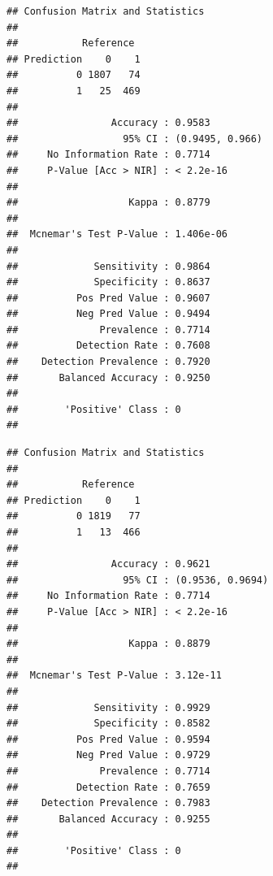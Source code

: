 \documentclass[]{article}
\newenvironment{Shaded}{\begin{snugshade}}{\end{snugshade}}
\newcommand{\CommentTok}[1]{\textcolor[rgb]{0.56,0.35,0.01}{\textit{#1}}}
\newcommand{\KeywordTok}[1]{\textcolor[rgb]{0.13,0.29,0.53}{\textbf{#1}}}
\newcommand{\NormalTok}[1]{#1}
\newcommand{\OperatorTok}[1]{\textcolor[rgb]{0.81,0.36,0.00}{\textbf{#1}}}
\begin{document}
\begin{verbatim}
## Confusion Matrix and Statistics
## 
##           Reference
## Prediction    0    1
##          0 1807   74
##          1   25  469
##                                          
##                Accuracy : 0.9583         
##                  95% CI : (0.9495, 0.966)
##     No Information Rate : 0.7714         
##     P-Value [Acc > NIR] : < 2.2e-16      
##                                          
##                   Kappa : 0.8779         
##                                          
##  Mcnemar's Test P-Value : 1.406e-06      
##                                          
##             Sensitivity : 0.9864         
##             Specificity : 0.8637         
##          Pos Pred Value : 0.9607         
##          Neg Pred Value : 0.9494         
##              Prevalence : 0.7714         
##          Detection Rate : 0.7608         
##    Detection Prevalence : 0.7920         
##       Balanced Accuracy : 0.9250         
##                                          
##        'Positive' Class : 0              
## 
\end{verbatim}

\begin{Shaded}
\end{Shaded}

\begin{verbatim}
## Confusion Matrix and Statistics
## 
##           Reference
## Prediction    0    1
##          0 1819   77
##          1   13  466
##                                           
##                Accuracy : 0.9621          
##                  95% CI : (0.9536, 0.9694)
##     No Information Rate : 0.7714          
##     P-Value [Acc > NIR] : < 2.2e-16       
##                                           
##                   Kappa : 0.8879          
##                                           
##  Mcnemar's Test P-Value : 3.12e-11        
##                                           
##             Sensitivity : 0.9929          
##             Specificity : 0.8582          
##          Pos Pred Value : 0.9594          
##          Neg Pred Value : 0.9729          
##              Prevalence : 0.7714          
##          Detection Rate : 0.7659          
##    Detection Prevalence : 0.7983          
##       Balanced Accuracy : 0.9255          
##                                           
##        'Positive' Class : 0               
## 
\end{verbatim}
\end{document}
